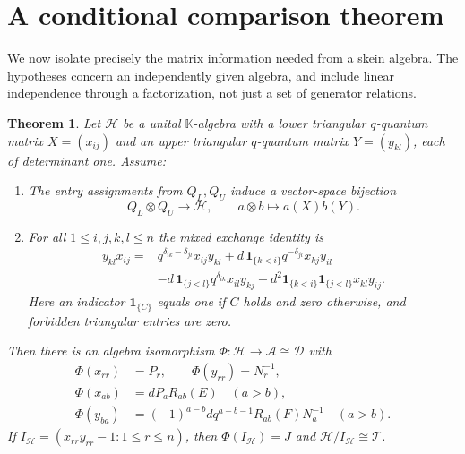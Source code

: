 \documentclass[11pt]{article}
\newtheorem{theorem}{Theorem}[section]
\theoremstyle{definition}
\theoremstyle{remark}
\newcommand{\kk}{\mathbb{K}}
\newcommand{\sgnind}[1]{\mathbf{1}_{\{#1\}}}
\newcommand{\cA}{\mathcal{A}}
\newcommand{\cT}{\mathcal{T}}
\newcommand{\cD}{\mathcal{D}}
\newcommand{\cH}{\mathcal{H}}
\begin{document}
\section{A conditional comparison theorem}\label{sec:comparison}

We now isolate precisely the matrix information needed from a skein algebra. The hypotheses concern an independently given algebra, and include linear independence through a factorization, not just a set of generator relations.

\begin{theorem}\label{thm:comparison}
Let $\cH$ be a unital $\kk$-algebra with a lower triangular $q$-quantum matrix $X=(x_{ij})$ and an upper triangular $q$-quantum matrix $Y=(y_{kl})$, each of determinant one. Assume:
\begin{enumerate}
\item The entry assignments from $Q_L,Q_U$ induce a vector-space bijection
\begin{equation}\label{eq:factorization}
 Q_L\otimes Q_U\longrightarrow\cH,\qquad a\otimes b\longmapsto a(X)b(Y).
\end{equation}
\item For all $1\leq i,j,k,l\leq n$ the mixed exchange identity is
\begin{equation}\label{eq:MX}
\begin{aligned}
 y_{kl}x_{ij}={}&q^{\delta_{ik}-\delta_{jl}}x_{ij}y_{kl}
 +d\,\sgnind{k<i}q^{-\delta_{jl}}x_{kj}y_{il}\\
 &-d\,\sgnind{j<l}q^{\delta_{ik}}x_{il}y_{kj}
 -d^2\sgnind{k<i}\sgnind{j<l}x_{kl}y_{ij}.
\end{aligned}
\end{equation}
Here an indicator $\sgnind{C}$ equals one if $C$ holds and zero otherwise, and forbidden triangular entries are zero.
\end{enumerate}
Then there is an algebra isomorphism $\Phi:\cH\to\cA\cong\cD$ with
\begin{equation}\label{eq:all-images}
 \begin{aligned}
 \Phi(x_{rr})&=P_r,\qquad \Phi(y_{rr})=N_r^{-1},\\
 \Phi(x_{ab})&=dP_aR_{ab}(E)\quad(a>b),\\
 \Phi(y_{ba})&=(-1)^{a-b}dq^{a-b-1}R_{ab}(F)N_a^{-1}\quad(a>b).
 \end{aligned}
\end{equation}
If $I_{\cH}=(x_{rr}y_{rr}-1:1\leq r\leq n)$, then $\Phi(I_{\cH})=J$ and $\cH/I_{\cH}\cong\cT$.
\end{theorem}
\end{document}
